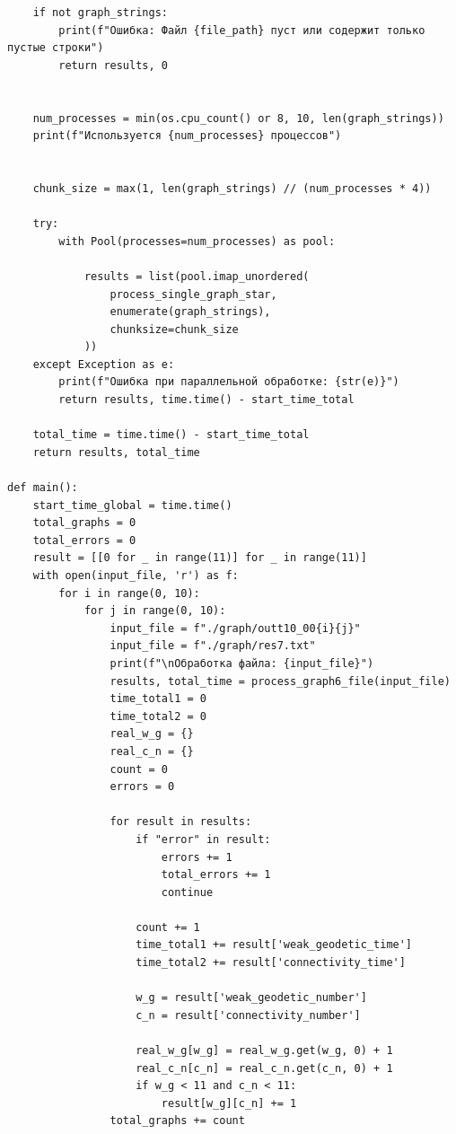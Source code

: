 \documentclass[bachelor, och, nir]{SCWorks}
\begin{document}
\begin{verbatim}
    if not graph_strings:
        print(f"Ошибка: Файл {file_path} пуст или содержит только пустые строки")
        return results, 0
    

    num_processes = min(os.cpu_count() or 8, 10, len(graph_strings))
    print(f"Используется {num_processes} процессов")
    

    chunk_size = max(1, len(graph_strings) // (num_processes * 4))
    
    try:
        with Pool(processes=num_processes) as pool:

            results = list(pool.imap_unordered(
                process_single_graph_star,
                enumerate(graph_strings),
                chunksize=chunk_size
            ))
    except Exception as e:
        print(f"Ошибка при параллельной обработке: {str(e)}")
        return results, time.time() - start_time_total
    
    total_time = time.time() - start_time_total
    return results, total_time

def main():
    start_time_global = time.time()
    total_graphs = 0
    total_errors = 0
    result = [[0 for _ in range(11)] for _ in range(11)]
    with open(input_file, 'r') as f:
        for i in range(0, 10):
            for j in range(0, 10):
                input_file = f"./graph/outt10_00{i}{j}"
                input_file = f"./graph/res7.txt"
                print(f"\nОбработка файла: {input_file}")
                results, total_time = process_graph6_file(input_file)
                time_total1 = 0
                time_total2 = 0
                real_w_g = {}
                real_c_n = {}
                count = 0
                errors = 0
                
                for result in results:
                    if "error" in result:
                        errors += 1
                        total_errors += 1
                        continue
                        
                    count += 1
                    time_total1 += result['weak_geodetic_time']
                    time_total2 += result['connectivity_time']
                    
                    w_g = result['weak_geodetic_number']
                    c_n = result['connectivity_number']
                    
                    real_w_g[w_g] = real_w_g.get(w_g, 0) + 1
                    real_c_n[c_n] = real_c_n.get(c_n, 0) + 1
                    if w_g < 11 and c_n < 11:
                        result[w_g][c_n] += 1
                total_graphs += count


\end{verbatim}
\end{document}
